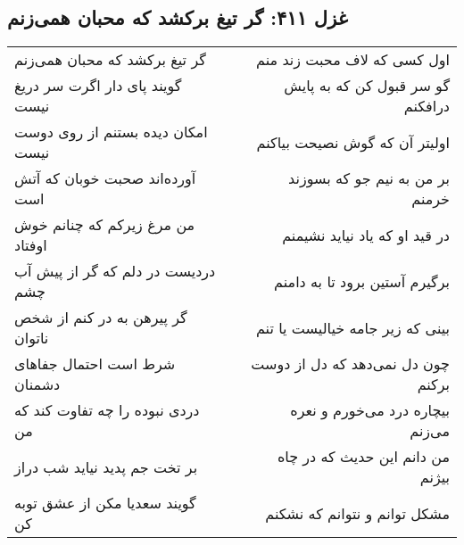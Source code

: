 \begin{center}
\section*{غزل ۴۱۱: گر تیغ برکشد که محبان همی‌زنم}
\label{sec:411}
\begin{longtable}{l p{0.5cm} r}
گر تیغ برکشد که محبان همی‌زنم
&&
اول کسی که لاف محبت زند منم
\\
گویند پای دار اگرت سر دریغ نیست
&&
گو سر قبول کن که به پایش درافکنم
\\
امکان دیده بستنم از روی دوست نیست
&&
اولیتر آن که گوش نصیحت بیاکنم
\\
آورده‌اند صحبت خوبان که آتش است
&&
بر من به نیم جو که بسوزند خرمنم
\\
من مرغ زیرکم که چنانم خوش اوفتاد
&&
در قید او که یاد نیاید نشیمنم
\\
دردیست در دلم که گر از پیش آب چشم
&&
برگیرم آستین برود تا به دامنم
\\
گر پیرهن به در کنم از شخص ناتوان
&&
بینی که زیر جامه خیالیست یا تنم
\\
شرط است احتمال جفاهای دشمنان
&&
چون دل نمی‌دهد که دل از دوست برکنم
\\
دردی نبوده را چه تفاوت کند که من
&&
بیچاره درد می‌خورم و نعره می‌زنم
\\
بر تخت جم پدید نیاید شب دراز
&&
من دانم این حدیث که در چاه بیژنم
\\
گویند سعدیا مکن از عشق توبه کن
&&
مشکل توانم و نتوانم که نشکنم
\\
\end{longtable}
\end{center}
